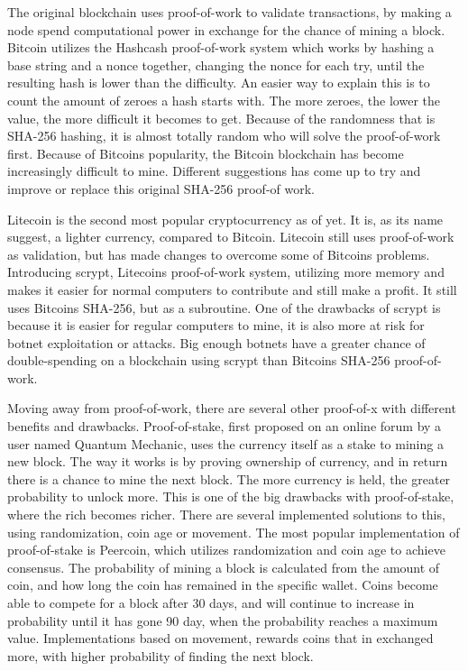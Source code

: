 \documentclass[11pt]{article}
\begin{document}
The original blockchain uses proof-of-work to validate transactions, by making a node spend computational power in exchange for the chance of mining a block. Bitcoin utilizes the Hashcash\cite{hashcash} proof-of-work system which works by hashing a base string and a nonce together, changing the nonce for each try, until the resulting hash is lower than the difficulty. An easier way to explain this is to count the amount of zeroes a hash starts with. The more zeroes, the lower the value, the more difficult it becomes to get. Because of the randomness that is SHA-256 hashing, it is almost totally random who will solve the proof-of-work first. Because of Bitcoins popularity, the Bitcoin blockchain has become increasingly difficult to mine. Different suggestions has come up to try and improve or replace this original SHA-256 proof-of work. 

Litecoin is the second most popular cryptocurrency as of yet. It is, as its name suggest, a lighter currency, compared to Bitcoin. Litecoin still uses proof-of-work as validation, but has made changes to overcome some of Bitcoins problems. Introducing scrypt, Litecoins proof-of-work system, utilizing more memory and makes it easier for normal computers to contribute and still make a profit. It still uses Bitcoins SHA-256, but as a subroutine. One of the drawbacks of scrypt is because it is easier for regular computers to mine, it is also more at risk for botnet exploitation or attacks. Big enough botnets have a greater chance of double-spending on a blockchain using scrypt than Bitcoins SHA-256 proof-of-work.

Moving away from proof-of-work, there are several other proof-of-x with different benefits and drawbacks. Proof-of-stake, first proposed on an online forum by a user named Quantum Mechanic, uses the currency itself as a stake to mining a new block. The way it works is by proving ownership of currency, and in return there is a chance to mine the next block. The more currency is held, the greater probability to unlock more. This is one of the big drawbacks with proof-of-stake, where the rich becomes richer. There are several implemented solutions to this, using randomization, coin age or movement. The most popular implementation of proof-of-stake is Peercoin, which utilizes randomization and coin age to achieve consensus. The probability of mining a block is calculated from the amount of coin, and how long the coin has remained in the specific wallet. Coins become able to compete for a block after 30 days, and will continue to increase in probability until it has gone 90 day, when the probability reaches a maximum value. Implementations based on movement, rewards coins that in exchanged more, with higher probability of finding the next block. 
\end{document}
